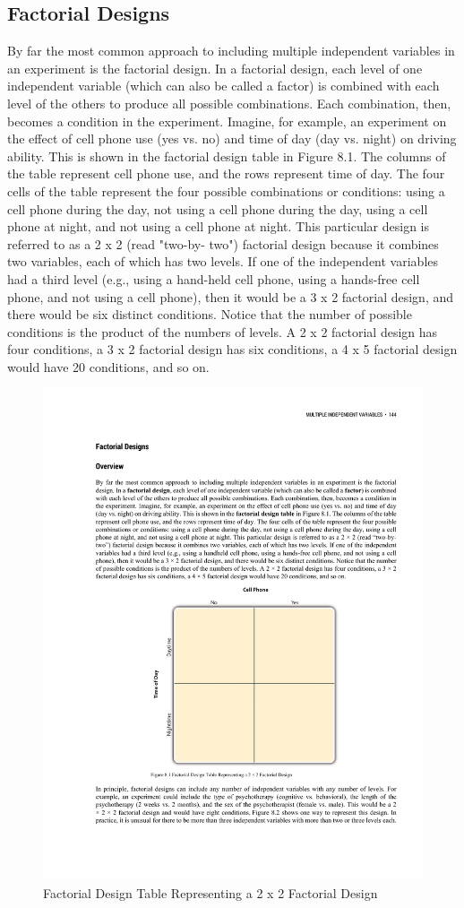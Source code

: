\subsection{Factorial Designs }

By far the most common approach to including multiple independent variables in an experiment is the factorial design. In a factorial design, each level of one independent variable (which can also be called a factor) is combined with each level of the others to produce all possible combinations. Each combination, then, becomes a condition in the experiment. Imagine, for example, an experiment on the effect of cell phone use (yes vs. no) and time of day (day vs. night) on driving ability. This is shown in the factorial design table in Figure 8.1. The columns of the table represent cell phone use, and the rows represent time of day. The four cells of the table represent the four possible combinations or conditions: using a cell phone during the day, not using a cell phone during the day, using a cell phone at night, and not using a cell phone at night. This particular design is referred to as a 2 x 2 (read "two-by- two") factorial design because it combines two variables, each of which has two levels. If one of the independent variables had a third level (e.g., using a hand-held cell phone, using a hands-free cell phone, and not using a cell phone), then it would be a 3 x 2 factorial design, and there would be six distinct conditions. Notice that the number of possible conditions is the product of the numbers of levels. A 2 x 2 factorial design has four conditions, a 3 x 2 factorial design has six conditions, a 4 x 5 factorial design would have 20 conditions, and so on.

\begin{figure}
\includegraphics[width=.7\linewidth]{figures/C8factorial.pdf}
\caption{Factorial Design Table Representing a 2 x 2 Factorial Design}
\label{fig:factorial}
\end{figure}

